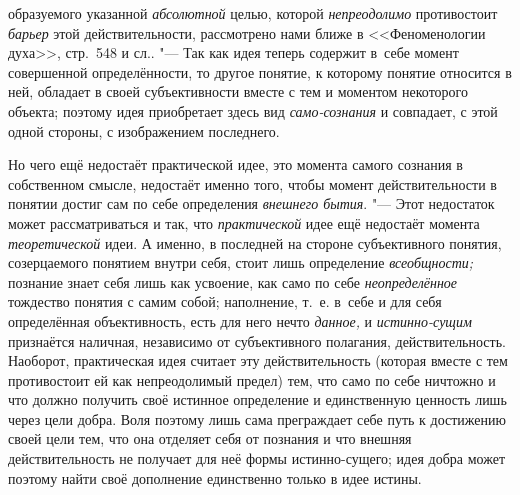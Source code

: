 образуемого указанной {\em абсолютной}
целью, которой
{\em непреодолимо}
противостоит {\em барьер}
этой действительности, рассмотрено нами ближе в
<<Феноменологии духа>>, стр.~548 и
сл..
"--- Так как идея теперь содержит в~себе момент совершенной
определённости, то другое понятие, к которому понятие относится в ней,
обладает в своей субъективности вместе с тем и моментом некоторого объекта;
поэтому идея приобретает здесь вид
{\em само-сознания}
и совпадает, с этой одной стороны, с изображением
последнего.

Но чего ещё недостаёт практической идее, это момента самого
сознания в собственном
смысле,
недостаёт именно того, чтобы момент действительности в
понятии достиг сам по себе определения
{\em внешнего бытия}. "---
Этот недостаток может рассматриваться и так, что
{\em практической} идее
ещё недостаёт момента
{\em теоретической} идеи.
А именно, в последней на стороне субъективного понятия, созерцаемого
понятием внутри себя, стоит лишь определение
{\em всеобщности;}
познание знает себя лишь как усвоение, как само по себе
{\em неопределённое}
тождество понятия с самим собой; наполнение, т.~е. в~себе и
для себя определённая объективность, есть для него нечто
{\em данное,} и
{\em истинно-сущим}
признаётся наличная, независимо от субъективного полагания,
действительность. Наоборот, практическая идея считает эту действительность
(которая вместе с тем противостоит ей как непреодолимый предел) тем, что
само по себе ничтожно и что должно получить своё истинное определение и
единственную ценность лишь через цели добра. Воля поэтому лишь сама
преграждает себе путь к достижению своей цели тем, что она отделяет себя от
познания и что внешняя действительность не получает для неё формы
истинно-сущего; идея добра может поэтому найти своё дополнение единственно
только в идее истины.

